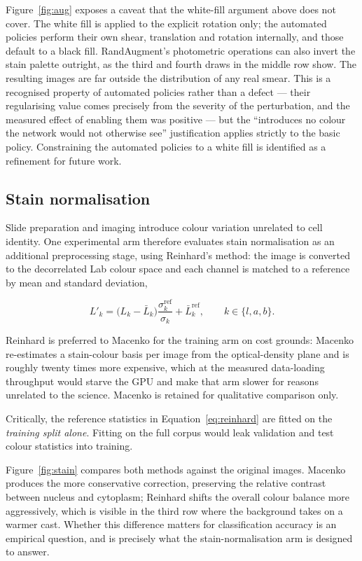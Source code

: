 \documentclass[11pt,a4paper]{article}
\begin{document}
Figure~\ref{fig:aug} exposes a caveat that the white-fill argument above does
not cover. The white fill is applied to the explicit rotation only; the
automated policies perform their own shear, translation and rotation
internally, and those default to a black fill. RandAugment's photometric
operations can also invert the stain palette outright, as the third and fourth
draws in the middle row show. The resulting images are far outside the
distribution of any real smear. This is a recognised property of automated
policies rather than a defect --- their regularising value comes precisely from
the severity of the perturbation, and the measured effect of enabling them was
positive --- but the ``introduces no colour the network would not otherwise
see'' justification applies strictly to the basic policy. Constraining the
automated policies to a white fill is identified as a refinement for future
work.

\subsection{Stain normalisation}

Slide preparation and imaging introduce colour variation unrelated to cell
identity. One experimental arm therefore evaluates stain normalisation as an
additional preprocessing stage, using Reinhard's method: the image is converted
to the decorrelated Lab colour space and each channel is matched to a reference
by mean and standard deviation,

\begin{equation}
  L'_k = \bigl(L_k - \bar{L}_k\bigr)\frac{\sigma_k^{\text{ref}}}{\sigma_k} + \bar{L}_k^{\text{ref}},
  \qquad k \in \{l, a, b\}.
  \label{eq:reinhard}
\end{equation}

Reinhard is preferred to Macenko for the training arm on cost grounds: Macenko
re-estimates a stain-colour basis per image from the optical-density plane and
is roughly twenty times more expensive, which at the measured data-loading
throughput would starve the GPU and make that arm slower for reasons unrelated
to the science. Macenko is retained for qualitative comparison only.

Critically, the reference statistics in Equation~\eqref{eq:reinhard} are fitted
on the \emph{training split alone}. Fitting on the full corpus would leak
validation and test colour statistics into training.

Figure~\ref{fig:stain} compares both methods against the original images.
Macenko produces the more conservative correction, preserving the relative
contrast between nucleus and cytoplasm; Reinhard shifts the overall colour
balance more aggressively, which is visible in the third row where the
background takes on a warmer cast. Whether this difference matters for
classification accuracy is an empirical question, and is precisely what the
stain-normalisation arm is designed to answer.
\end{document}

